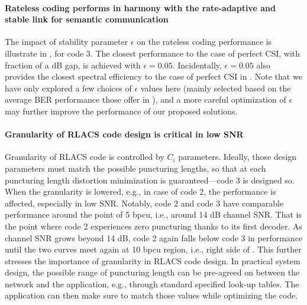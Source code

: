 \paragraph*{Rateless coding performs  in  harmony with the rate-adaptive and stable link for semantic communication} The impact of stability parameter $\epsilon$ on the rateless coding performance is illustrate in , for code 3. The closest performance to the case of perfect CSI, with fraction of a dB gap, is achieved  with $\epsilon = 0.05$. Incidentally, $\epsilon = 0.05$ also provides the closest spectral efficiency to the case of  perfect CSI in . Note that we have only explored a few choices of $\epsilon$ values here (mainly selected based on the average BER performance those offer in ), and a more careful optimization of $\epsilon$ may further improve the performance of our proposed solutions.







\paragraph*{Granularity of RLACS code design is critical in low SNR} Granularity of RLACS code is controlled by $C_i$ parameters. Ideally, those design parameters must match the possible puncturing lengths, so that at each puncturing length distortion minimization is guaranteed---code 3 is designed so. When the granularity is lowered, e.g., in case of code 2, the performance is affected, especially in low SNR. Notably, code 2 and code 3 have comparable performance around the point of 5 bpcu, i.e., around 14 dB channel SNR. That is the point where code 2 experiences zero puncturing thanks to its first decoder. As channel SNR grows beyond 14 dB, code 2 again falls below code 3 in performance until the two curves meet again at 10 bpcu region, i.e., right side of . This further stresses the importance of granularity in RLACS code design. In practical system design, the possible range of puncturing length can be pre-agreed on between the network and the application, e.g., through standard specified look-up tables. The application can then make sure to match those values while optimizing the code.



